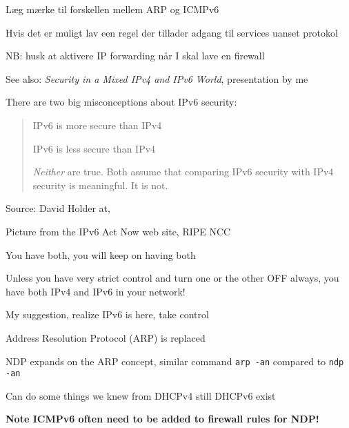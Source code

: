 \documentclass[Screen16to9,17pt]{foils}
\begin{document}

\begin{list1}
\item Læg mærke til forskellen mellem ARP og ICMPv6
\item Hvis det er muligt lav een regel der tillader adgang til services uanset protokol
\item NB: husk at aktivere IP forwarding når I skal lave en firewall
\end{list1}

See also:
\emph{Security in a Mixed IPv4 and IPv6 World}, presentation by me\\




There are two big misconceptions about IPv6 security:

\begin{quote}
\begin{list2}
\item IPv6 is more secure than IPv4
\item IPv6 is less secure than IPv4
\end{list2}

\emph{Neither} are true. Both assume that comparing IPv6 security with IPv4 security is meaningful. It is not.
\end{quote}
Source: David Holder at, 



Picture from the IPv6 Act Now web site, RIPE NCC

\begin{list2}
\item You have both, you will keep on having both
\item Unless you have very strict control and turn one or the other OFF always, you have both IPv4 and IPv6 in your network!
\item My suggestion, realize IPv6 is here, take control
\end{list2}




\begin{list1}
\item Address Resolution Protocol (ARP) is replaced
\item NDP expands on the ARP concept, similar command \verb+arp -an+ compared to \verb+ndp -an+
\item Can do some things we knew from DHCPv4 still DHCPv6 exist
\item {\bf Note ICMPv6 often need to be added to firewall rules for NDP!} {\myalert}
\end{list1}
\end{document}
